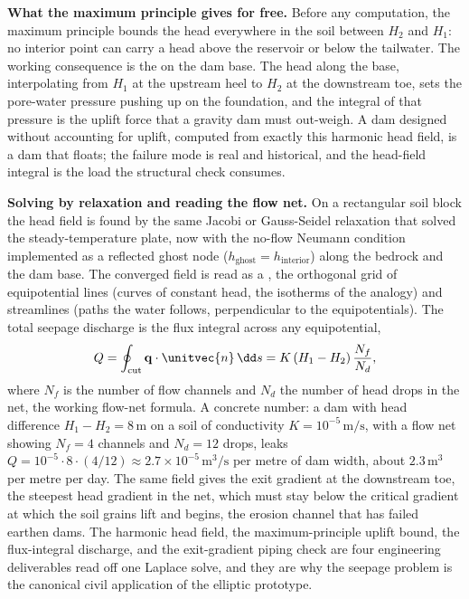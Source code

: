 \textbf{What the maximum principle gives for free.} Before any
computation, the maximum principle bounds the head everywhere in the
soil between $H_{2}$ and $H_{1}$: no interior point can carry a head
above the reservoir or below the tailwater. The working consequence
is the  on the dam base. The head along the
base, interpolating from $H_{1}$ at the upstream heel to $H_{2}$ at
the downstream toe, sets the pore-water pressure pushing up on the
foundation, and the integral of that pressure is the uplift force
that a gravity dam must out-weigh. A dam designed without accounting
for uplift, computed from exactly this harmonic head field, is a dam
that floats; the failure mode is real and historical, and the
head-field integral is the load the structural check consumes.

\textbf{Solving by relaxation and reading the flow net.} On a
rectangular soil block the head field is found by the same Jacobi or
Gauss-Seidel relaxation that solved the steady-temperature plate, now
with the no-flow Neumann condition implemented as a reflected ghost
node ($h_{\text{ghost}} = h_{\text{interior}}$) along the bedrock and
the dam base. The converged field is read as a ,
the orthogonal grid of equipotential lines (curves of constant head,
the isotherms of the analogy) and streamlines (paths the water
follows, perpendicular to the equipotentials). The total seepage
discharge is the flux integral across any equipotential,
\[
Q = \oint_{\text{cut}} \mathbf{q}\cdot\unitvec{n}\,\dd s
  = K\,(H_{1} - H_{2})\,\frac{N_{f}}{N_{d}},
\]
where $N_{f}$ is the number of flow channels and $N_{d}$ the number
of head drops in the net, the working flow-net formula. A concrete
number: a dam with head difference $H_{1} - H_{2} = 8\,\si{\meter}$
on a soil of conductivity $K = 10^{-5}\,\si{\meter\per\second}$, with
a flow net showing $N_{f} = 4$ channels and $N_{d} = 12$ drops, leaks
$Q = 10^{-5}\cdot 8\cdot (4/12) \approx 2.7\times 10^{-5}\,\si{\meter
\cubed\per\second}$ per metre of dam width, about $2.3\,\si{\meter
\cubed}$ per metre per day. The same field gives the exit gradient at
the downstream toe, the steepest head gradient in the net, which must
stay below the critical gradient at which the soil grains lift and
 begins, the erosion channel that has failed earthen
dams. The harmonic head field, the maximum-principle uplift bound,
the flux-integral discharge, and the exit-gradient piping check are
four engineering deliverables read off one Laplace solve, and they
are why the seepage problem is the canonical civil application of the
elliptic prototype.

